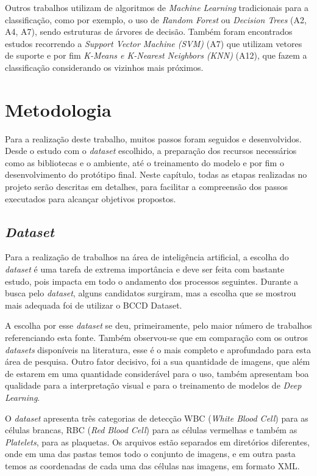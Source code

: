 Outros trabalhos utilizam de algoritmos de \emph{Machine Learning} tradicionais para a classificação, como por exemplo, o uso de \emph{Random Forest} ou \emph{Decision Trees}  (A2, A4, A7), sendo estruturas de árvores de decisão. Também foram encontrados estudos recorrendo a \emph{Support Vector Machine (SVM)} (A7) que utilizam vetores de suporte e por fim \emph{K-Means e K-Nearest Neighbors (KNN)} (A12), que fazem a classificação considerando os vizinhos mais próximos.

\chapter{Metodologia}
\label{chap:metodologia}

Para a realização deste trabalho, muitos passos foram seguidos e desenvolvidos. Desde o estudo com o \emph{dataset} escolhido, a preparação dos recursos necessários como as bibliotecas e o ambiente, até o treinamento do modelo e por fim o desenvolvimento do protótipo final. Neste capítulo, todas as etapas realizadas no projeto serão descritas em detalhes, para facilitar a compreensão dos passos executados para alcançar objetivos propostos.

\section{\emph{Dataset}}
Para a realização de trabalhos na área de inteligência artificial, a escolha do \emph{dataset} é uma tarefa de extrema importância e deve ser feita com bastante estudo, pois impacta em todo o andamento dos processos seguintes. Durante a busca pelo \emph{dataset}, alguns candidatos surgiram, mas a escolha que se mostrou mais adequada foi de utilizar o BCCD Dataset. \cite{datasetBCCD}

A escolha por esse \emph{dataset} se deu, primeiramente, pelo maior número de trabalhos referenciando esta fonte. Também observou-se que em comparação com os outros \emph{datasets} disponíveis na literatura, esse é o mais completo e aprofundado para esta área de pesquisa. Outro fator decisivo, foi a sua quantidade de imagens, que além de estarem em uma quantidade considerável para o uso, também apresentam boa qualidade para a interpretação visual e para o treinamento de modelos de \emph{Deep Learning}.

O \emph{dataset} apresenta três categorias de detecção WBC (\emph{White Blood Cell}) para as células brancas, RBC (\emph{Red Blood Cell}) para as células vermelhas e também as \emph{Platelets}, para as plaquetas. Os arquivos estão separados em diretórios diferentes, onde em uma das pastas temos todo o conjunto de imagens, e em outra pasta temos as coordenadas de cada uma das células nas imagens, em formato XML.

